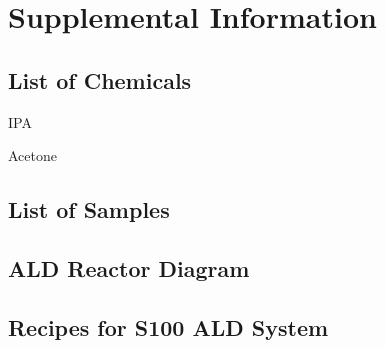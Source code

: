 \chapter{Supplemental Information}
\label{chap:appendix}
\thispagestyle{empty}


\section{List of Chemicals}
\label{sup:LoChemicals}










IPA

Acetone


\section{List of Samples}
\label{sup:LoSamples}



\section{ALD Reactor Diagram}
\label{sup:ALD-design}



\section{Recipes for S100 ALD System}
\label{sup:ALD-recipes}


